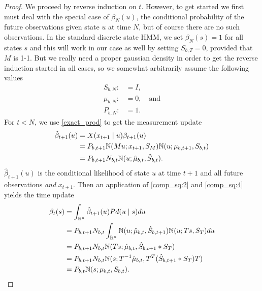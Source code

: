 \documentclass[12pt,leqno]{article}
\begin{document}
\begin{proof}
We proceed by reverse induction on $t$. However, to get started we first must  deal with
the special case of $\beta_{N}(u)$, the conditional probability of the future observations given
state $u$ at time $N$, but of course there are no such observations.  In the standard discrete
state HMM, we set $\beta_N(s) = 1$ for all states $s$ and this will work in our case as well by
setting $S_{b,T} = 0$, provided that $M$ is 1-1. But we really need a proper gaussian 
density in order to get the reverse induction started in all cases, so we somewhat arbitrarily
assume the following values
\begin{align*}
  S_{b,N} :&= I,\\
  \mu_{b,N} :&= 0,\quad\text{and}\\
  P_{b,N} :&= 1.
\end{align*}
  For $t <  N$, we use \eqref{exact_prod} to get the measurement update 
  \begin{align*}
    \hat{\beta}_{t+1}(u) &= X(x_{t+1}\mid u)\beta_{t+1}(u)\\
    &= P_{b,t+1}{\mathbb N}(Mu;x_{t+1},S_M){\mathbb N}(u;\mu_{b,t+1},S_{b,t})\\
    &= P_{b,t+1}N_{b,t}{\mathbb N}(u;\hat{\mu}_{b,t},\hat{S}_{b,t}).
  \end{align*}
  $\hat{\beta}_{t+1}(u)$ is the conditional likelihood of state $u$ at time $t+1$ and all future observations {\em and}
  $x_{t+1}$. Then an application of \eqref{comp_sq:2} and \eqref{comp_sq:4} yields the time update
  \begin{align*}
    \beta_t(s) &= \int_{{\mathbb R}^n}\hat{\beta}_{t+1}(u)Pd(u\mid s)du \\
    &= P_{b,t+1}N_{b,t}\int_{{\mathbb R}^n}{\mathbb N}(u;\hat{\mu}_{b,t},\hat{S}_{b,t+1}){\mathbb N}(u;Ts,S_T)du\\
    &=P_{b,t+1}N_{b,t}{\mathbb N}(Ts;\hat{\mu}_{b,t},\hat{S}_{b,t+1}*S_T)\\
    &=P_{b,t+1}N_{b,t}{\mathbb N}(s;T^{-1}\hat{\mu}_{b,t},T^T(\hat{S}_{b,t+1}*S_T)T)\\
    &=P_{b,t}{\mathbb N}(s;\mu_{b,t},S_{b,t}).
  \end{align*}
\end{proof}
\end{document}
